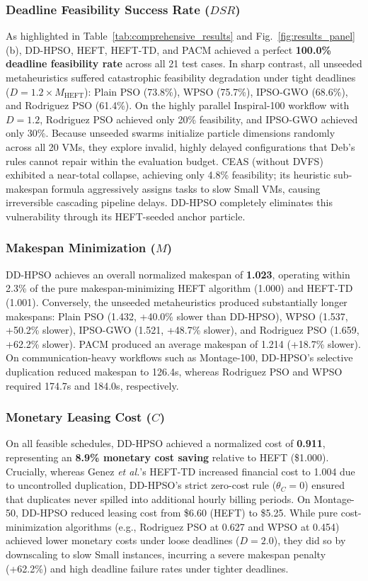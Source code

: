 \documentclass[journal]{IEEEtran}
\begin{document}
\subsubsection{Deadline Feasibility Success Rate ($DSR$)}
As highlighted in Table~\ref{tab:comprehensive_results} and Fig.~\ref{fig:results_panel}(b), DD-HPSO, HEFT, HEFT-TD, and PACM achieved a perfect \textbf{100.0\% deadline feasibility rate} across all 21 test cases. In sharp contrast, all unseeded metaheuristics suffered catastrophic feasibility degradation under tight deadlines ($D = 1.2 \times M_{\text{HEFT}}$): Plain PSO (73.8\%), WPSO (75.7\%), IPSO-GWO (68.6\%), and Rodriguez PSO (61.4\%). On the highly parallel Inspiral-100 workflow with $D = 1.2$, Rodriguez PSO achieved only 20\% feasibility, and IPSO-GWO achieved only 30\%. Because unseeded swarms initialize particle dimensions randomly across all 20 VMs, they explore invalid, highly delayed configurations that Deb's rules cannot repair within the evaluation budget. CEAS (without DVFS) exhibited a near-total collapse, achieving only 4.8\% feasibility; its heuristic sub-makespan formula aggressively assigns tasks to slow Small VMs, causing irreversible cascading pipeline delays. DD-HPSO completely eliminates this vulnerability through its HEFT-seeded anchor particle.

\subsubsection{Makespan Minimization ($M$)}
DD-HPSO achieves an overall normalized makespan of \textbf{1.023}, operating within 2.3\% of the pure makespan-minimizing HEFT algorithm (1.000) and HEFT-TD (1.001). Conversely, the unseeded metaheuristics produced substantially longer makespans: Plain PSO (1.432, +40.0\% slower than DD-HPSO), WPSO (1.537, +50.2\% slower), IPSO-GWO (1.521, +48.7\% slower), and Rodriguez PSO (1.659, +62.2\% slower). PACM produced an average makespan of 1.214 (+18.7\% slower). On communication-heavy workflows such as Montage-100, DD-HPSO's selective duplication reduced makespan to 126.4s, whereas Rodriguez PSO and WPSO required 174.7s and 184.0s, respectively.

\subsubsection{Monetary Leasing Cost ($C$)}
On all feasible schedules, DD-HPSO achieved a normalized cost of \textbf{0.911}, representing an \textbf{8.9\% monetary cost saving} relative to HEFT (\$1.000). Crucially, whereas Genez \textit{et al.}'s HEFT-TD increased financial cost to 1.004 due to uncontrolled duplication, DD-HPSO's strict zero-cost rule ($\theta_C = 0$) ensured that duplicates never spilled into additional hourly billing periods. On Montage-50, DD-HPSO reduced leasing cost from \$6.60 (HEFT) to \$5.25. While pure cost-minimization algorithms (e.g., Rodriguez PSO at 0.627 and WPSO at 0.454) achieved lower monetary costs under loose deadlines ($D = 2.0$), they did so by downscaling to slow Small instances, incurring a severe makespan penalty (+62.2\%) and high deadline failure rates under tighter deadlines.
\end{document}
